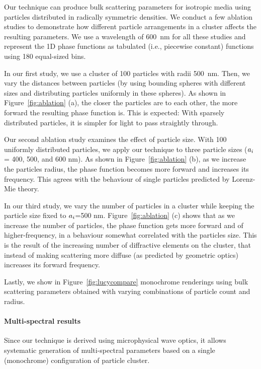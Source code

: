 Our technique can produce bulk scattering parameters for isotropic media using particles distributed in radically symmetric densities.
We conduct a few ablation studies to demonstrate how different particle arrangements in a cluster affects the resulting parameters.
We use a wavelength of 600~nm for all these studies and represent the 1D phase functions as tabulated (i.e., piecewise constant) functions using 180 equal-sized bins.

In our first study, we use a cluster of 100 particles with radii 500~nm. Then, we vary the distances between particles (by using bounding spheres with different sizes and distributing particles uniformly in these spheres).
As shown in Figure~\ref{fig:ablation} (a), the closer the particles are to each other, the more forward the resulting phase function is.
This is expected: With sparsely distributed particles, it is simpler for light to pass straightly through.

Our second ablation study examines the effect of particle size. With 100 uniformly distributed particles, we apply our technique to three particle sizes ($a_i$= 400, 500, and 600 nm).
As shown in Figure~\ref{fig:ablation} (b), as we increase the particles radius, the phase function becomes more forward and increases its frequency. This agrees with the behaviour of single particles predicted by Lorenz-Mie theory. 

In our third study, we vary the number of particles in a cluster while keeping the particle size fixed to $a_i$=500 nm.
Figure~\ref{fig:ablation} (c) shows that as we increase the number of particles, the phase function gets more forward and of higher-frequency, in a behaviour somewhat correlated with the particles size. This is the result of the increasing number of diffractive elements on the cluster, that instead of making scattering more diffuse (as predicted by geometric optics) increases its forward frequency. 

Lastly, we show in Figure~\ref{fig:lucycompare} monochrome renderings using bulk scattering parameters obtained with varying combinations of particle count and radius.




\paragraph{Multi-spectral results}
Since our technique is derived using microphysical wave optics, it allows systematic generation of multi-spectral parameters based on a single (monochrome) configuration of particle cluster.

